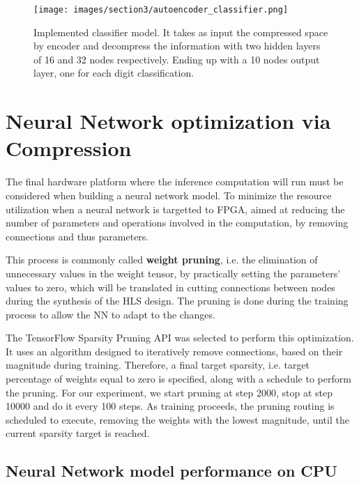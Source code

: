 \documentclass{article}
\begin{document}
\begin{figure}[H]
  \centering
  \texttt{[image: images/section3/autoencoder\_classifier.png]}
  \caption{Implemented classifier model. It takes as input the compressed space by encoder
  and decompress the information with two hidden layers of 16 and 32 nodes respectively. 
  Ending up with a 10 nodes output layer, one for each digit classification.}
  \label{fig:classifier}
  \end{figure}

\section{Neural Network optimization via Compression}

The final hardware platform where the inference computation will run must be considered when building a neural network model. 
To minimize the resource utilization when a neural network is targetted to FPGA, 
aimed at reducing the number of parameters and operations involved in the computation, 
by removing connections and thus parameters.

\par This process is commonly called \textbf{weight pruning}, i.e. the elimination of unnecessary values in the weight tensor, 
by practically setting the parameters' values to zero, which will be translated in cutting connections between nodes 
during the synthesis of the HLS design. 
The pruning is done during the training process to allow the NN to adapt to the changes.

\par The TensorFlow Sparsity Pruning API was selected to perform this optimization.
It uses an algorithm designed to iteratively remove connections, based on their magnitude during training.
Therefore, a final target sparsity, i.e. target percentage of weights equal to zero is specified,
along with a schedule to perform the pruning. 
For our experiment, we start pruning at step 2000, stop at step 10000 and do it every 100 steps.
As training proceeds, the pruning routing is scheduled to execute, removing the weights with the lowest magnitude, 
until the current sparsity target is reached.

\subsection{Neural Network model performance on CPU}
\end{document}
